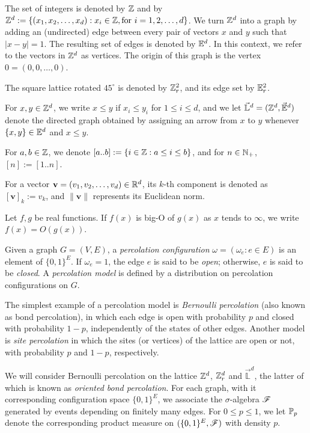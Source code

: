 	The set of integers is denoted by $\mathbb{Z}$ and by $\mathbb{Z}^d := \{(x_1, x_2, \ldots, x_d) : x_i \in \mathbb{Z}, \text{for } i =  1, 2, \ldots, d\}$. We turn $\mathbb{Z}^d$ into a graph by adding an (undirected) edge between every pair of vectors $x$ and $y$ such that $|x - y| = 1$. The resulting set of edges is denoted by $\mathbb{E}^d$. In this context, we refer to the vectors in $\mathbb{Z}^d$ as vertices. The origin of this graph is the vertex $0 = (0, 0, \ldots, 0)$. 

	The square lattice rotated $45^\circ$ is denoted by $\mathbb{Z}^2_{r}$, and its edge set by $\mathbb{E}_r^2$.

	For $x, y \in \mathbb{Z}^d$, we write $x \leq y$ if $x_i \leq y_i$ for $1 \leq i \leq d$, and we let $\vec{\mathbb{L}}^d = (\mathbb{Z}^d, \vec{\mathbb{E}}^d)$ denote the directed graph obtained by assigning an arrow from $x$ to $y$ whenever $\{x, y\} \in \mathbb{E}^d$ and $x \leq y$.

	For $a, b \in \mathbb{Z}$, we denote $[a..b] := \{i \in \mathbb{Z} : a \leq i \leq b\}$, and for $n \in \mathbb{N}_+$, $[n] := [1..n]$.

	For a vector $\mathbf{v} = (v_1, v_2, \ldots, v_d) \in \mathbb{R}^d$, its $k$-th component is denoted as $[\mathbf{v}]_k := v_k$, and $\|\mathbf{v}\|$ represents its Euclidean norm.


	Let $f, g$ be real functions. If $f(x)$ is big-O of $g(x)$ as $x$ tends to $\infty$, we write $f(x) = O(g(x))$.

	Given a graph $G =(V, E)$, a \emph{percolation configuration} $\omega = (\omega_e \colon e \in E)$ is an element of $\{0, 1\}^E$. If $\omega_e = 1$, the edge $e$ is said to be \emph{open}; otherwise, $e$ is said to be \emph{closed}. A \emph{percolation model} is defined by a distribution on percolation configurations on $G$. 

	The simplest example of a percolation model is \emph{Bernoulli percolation} (also known as bond percolation), in which each edge is open with probability $p$ and closed with probability $1-p$, independently of the states of other edges. Another model is \emph{site percolation} in which the sites (or vertices) of the lattice are open or not, with probability $p$ and $1 - p$, respectively.

	We will consider Bernoulli percolation on the lattice $\mathbb{Z}^d$, $\mathbb{Z}_r^d$ and $\vec{\mathbb{L}}^d$, the latter of which is known as \emph{oriented bond percolation}. For each graph, with it corresponding configuration space $\{0, 1\}^E$, we associate the $\sigma$-algebra $\mathscr{F}$ generated by events depending on finitely many edges. For $0 \leq p \leq 1$, we let $\mathbb{P}_p$ denote the corresponding product measure on $(\{0, 1\}^E, \mathscr{F})$ with density $p$. 